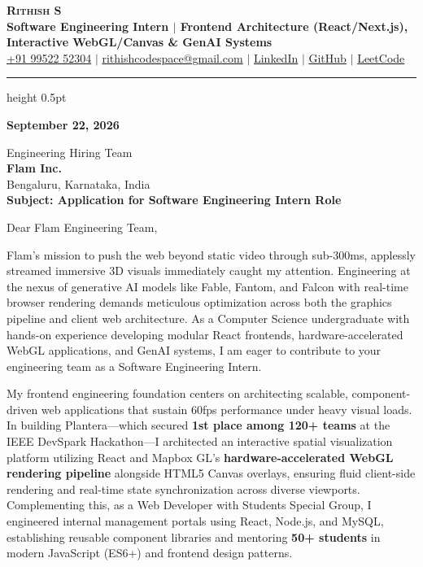 \documentclass[letterpaper,11pt]{article}
\begin{document}
\begin{center}
    {\textbf{\Huge \scshape Rithish S}} \\ \vspace{3pt}
    {\small \textbf{\color{headingcolor}Software Engineering Intern $|$ Frontend Architecture (React/Next.js), Interactive WebGL/Canvas \& GenAI Systems}} \\ \vspace{3pt}
    \small
    \href{tel:+919952252304}{+91 99522 52304} $|$
    \href{mailto:rithishcodespace@gmail.com}{rithishcodespace@gmail.com} $|$
    \href{https://www.linkedin.com/in/rithish-saravanan-32a39431a/}{LinkedIn} $|$
    \href{https://github.com/rithishcodespace}{GitHub} $|$
    \href{https://leetcode.com/rithishcodespace}{LeetCode}
\end{center}

\vspace{-4pt}
\hrule height 0.5pt \relax
\vspace{10pt}

\textbf{September 22, 2026}

\vspace{2pt}
Engineering Hiring Team \\
\textbf{Flam Inc.} \\
Bengaluru, Karnataka, India \\

\vspace{4pt}
\textbf{Subject: Application for Software Engineering Intern Role}

\vspace{4pt}
Dear Flam Engineering Team,

Flam's mission to push the web beyond static video through sub-300ms, applessly streamed immersive 3D visuals immediately caught my attention. Engineering at the nexus of generative AI models like Fable, Fantom, and Falcon with real-time browser rendering demands meticulous optimization across both the graphics pipeline and client web architecture. As a Computer Science undergraduate with hands-on experience developing modular React frontends, hardware-accelerated WebGL applications, and GenAI systems, I am eager to contribute to your engineering team as a Software Engineering Intern.

My frontend engineering foundation centers on architecting scalable, component-driven web applications that sustain 60fps performance under heavy visual loads. In building Plantera—which secured \textbf{1st place among 120+ teams} at the IEEE DevSpark Hackathon—I architected an interactive spatial visualization platform utilizing React and Mapbox GL's \textbf{hardware-accelerated WebGL rendering pipeline} alongside HTML5 Canvas overlays, ensuring fluid client-side rendering and real-time state synchronization across diverse viewports. Complementing this, as a Web Developer with Students Special Group, I engineered internal management portals using React, Node.js, and MySQL, establishing reusable component libraries and mentoring \textbf{50+ students} in modern JavaScript (ES6+) and frontend design patterns.
\end{document}
